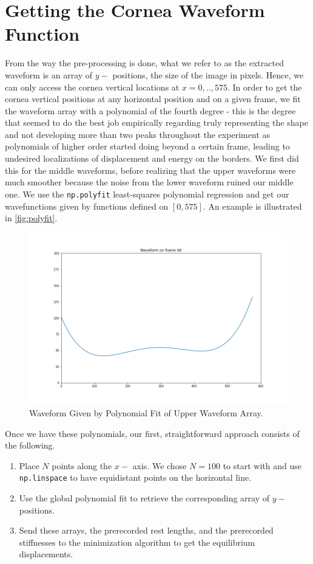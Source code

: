 \documentclass[epjST]{svjour}
\begin{document}
\section{Getting the Cornea Waveform Function}
From the way the pre-processing is done, what we refer to as the extracted waveform is an array of $y-$ positions, the size of the image in pixels. Hence, we can only access the cornea vertical locations at $x=0,..,575$. In order to get the cornea vertical positions at any horizontal position and on a given frame, we fit the waveform array with a polynomial of the fourth degree - this is the degree that seemed to do the best job empirically regarding truly representing the shape and not developing more than two peaks throughout the experiment as polynomials of higher order started doing beyond a certain frame, leading to undesired localizations of displacement and energy on the borders. We first did this for the middle waveforms, before realizing that the upper waveforms were much smoother because the noise from the lower waveform ruined our middle one. We use the \texttt{np.polyfit} least-squares polynomial regression and get our wavefunctions given by functions defined on $[0,575]$. An example is illustrated in \autoref{fig:polyfit}.
\begin{figure}[h]
    \centering
    \includegraphics[width=0.9\linewidth]{figures/processing/48.png}
    \caption{Waveform Given by Polynomial Fit of Upper Waveform Array.}
    \label{fig:polyfit}
\end{figure}
Once we have these polynomials, our first, straightforward approach consists of the following.
\begin{enumerate}
    \item Place $N$ points along the $x-$ axis. We chose $N= 100$ to start with and use \texttt{np.linspace} to have equidistant points on the horizontal line.
    \\\item Use the global polynomial fit to retrieve the corresponding array of $y-$ positions.
    \\\item Send these arrays, the prerecorded rest lengths, and the prerecorded stiffnesses to the minimization algorithm to get the equilibrium displacements.
\end{enumerate}
\end{document}
